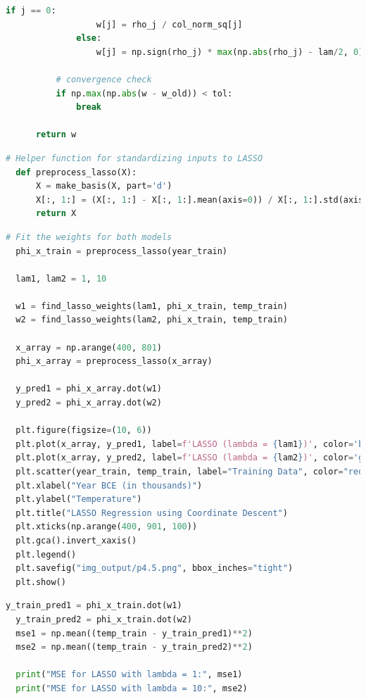\documentclass[submit]{../harvardml}
\begin{document}
\begin{tcolorbox}[title=Solution, colback=white, colframe=black, breakable]
\begin{enumerate}
\begin{lstlisting}[language=Python]
              if j == 0:
                  w[j] = rho_j / col_norm_sq[j]
              else:
                  w[j] = np.sign(rho_j) * max(np.abs(rho_j) - lam/2, 0) / col_norm_sq[j]
          
          # convergence check
          if np.max(np.abs(w - w_old)) < tol:
              break
              
      return w
      \end{lstlisting}
  
      \begin{lstlisting}[language=Python]
  # Helper function for standardizing inputs to LASSO
  def preprocess_lasso(X):
      X = make_basis(X, part='d')
      X[:, 1:] = (X[:, 1:] - X[:, 1:].mean(axis=0)) / X[:, 1:].std(axis=0)
      return X
      \end{lstlisting}
  
      \begin{lstlisting}[language=Python]
  # Fit the weights for both models
  phi_x_train = preprocess_lasso(year_train)
  
  lam1, lam2 = 1, 10
  
  w1 = find_lasso_weights(lam1, phi_x_train, temp_train)
  w2 = find_lasso_weights(lam2, phi_x_train, temp_train)
  
  x_array = np.arange(400, 801)
  phi_x_array = preprocess_lasso(x_array)
  
  y_pred1 = phi_x_array.dot(w1)
  y_pred2 = phi_x_array.dot(w2)
  
  plt.figure(figsize=(10, 6))
  plt.plot(x_array, y_pred1, label=f'LASSO (lambda = {lam1})', color='blue')
  plt.plot(x_array, y_pred2, label=f'LASSO (lambda = {lam2})', color='green')
  plt.scatter(year_train, temp_train, label="Training Data", color="red")
  plt.xlabel("Year BCE (in thousands)")
  plt.ylabel("Temperature")
  plt.title("LASSO Regression using Coordinate Descent")
  plt.xticks(np.arange(400, 901, 100))
  plt.gca().invert_xaxis()
  plt.legend()
  plt.savefig("img_output/p4.5.png", bbox_inches="tight")
  plt.show()
      \end{lstlisting}
  
      \begin{lstlisting}[language=Python]
  y_train_pred1 = phi_x_train.dot(w1)
  y_train_pred2 = phi_x_train.dot(w2)
  mse1 = np.mean((temp_train - y_train_pred1)**2)
  mse2 = np.mean((temp_train - y_train_pred2)**2)
  
  print("MSE for LASSO with lambda = 1:", mse1)
  print("MSE for LASSO with lambda = 10:", mse2)
      \end{lstlisting}



\end{enumerate}
\end{tcolorbox}
\end{document}
